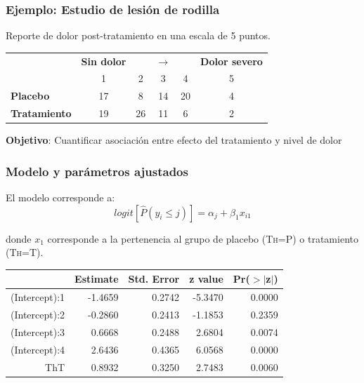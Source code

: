 \documentclass[]{beamer}
\begin{document}
\begin{frame}
	\frametitle{Ejemplo: Estudio de lesión de rodilla}
	Reporte de dolor post-tratamiento en una escala de 5 puntos.
	
\begin{table}[]
\begin{tabular}{lccccc}
                     & \textbf{Sin dolor} &    &  $\longrightarrow $  &    & \textbf{Dolor severo} \\
                     & 1                  & 2  & 3  & 4  & 5                     \\ \hline
\textbf{Placebo}     & 17                 & 8  & 14 & 20 & 4                     \\
\textbf{Tratamiento} & 19                 & 26 & 11 & 6  & 2                     \\ \hline
\end{tabular}
\end{table}
	
\textbf{Objetivo}: Cuantificar asociación entre efecto del tratamiento y nivel de dolor
\end{frame}


\begin{frame}
	\frametitle{Modelo y parámetros ajustados}

El modelo corresponde a:	
$$logit[\widehat{P}(y_i\leq j)] =\alpha_j + \beta_{1}x_{i1}$$

donde $x_1$ corresponde a la pertenencia al grupo de placebo (\textsc{Th}=P) o tratamiento (\textsc{Th}=T).

\begin{table}[ht]
\centering
\begin{tabular}{rrrrr}
  \hline
 & Estimate & Std. Error & z value & Pr($>$$|$z$|$) \\ 
  \hline
(Intercept):1 & -1.4659 & 0.2742 & -5.3470 & 0.0000 \\ 
  (Intercept):2 & -0.2860 & 0.2413 & -1.1853 & 0.2359 \\ 
  (Intercept):3 & 0.6668 & 0.2488 & 2.6804 & 0.0074 \\ 
  (Intercept):4 & 2.6436 & 0.4365 & 6.0568 & 0.0000 \\ 
  ThT & 0.8932 & 0.3250 & 2.7483 & 0.0060 \\ 
   \hline
\end{tabular}
\end{table}
\end{frame}
\end{document}
